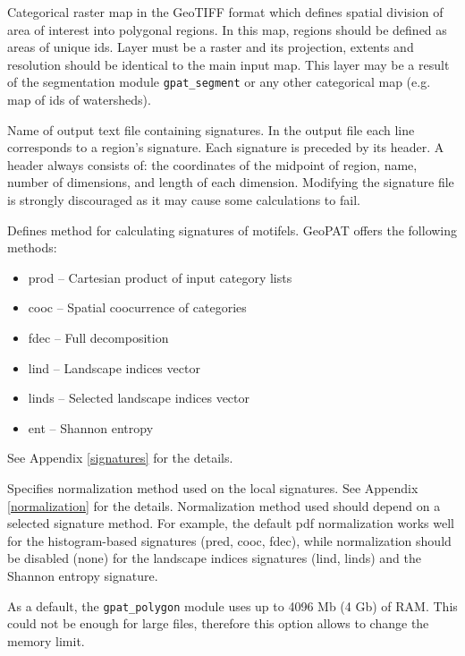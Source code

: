 
Categorical raster map in the GeoTIFF format which defines spatial division of area of interest into polygonal regions.
In this map, regions should be defined as areas of unique ids. 
Layer must be a raster and its projection, extents and resolution should be identical to the main input map. 
This layer may be a result of the segmentation module {\tt gpat\_segment} or any other categorical map (e.g. map of ids of watersheds).


Name of output text file containing signatures. 
In the output file each line corresponds to a region's signature.
Each signature is preceded by its header. 
A header always consists of: the coordinates of the midpoint of region, name, number of dimensions, and length of each dimension. 
Modifying the signature file is strongly discouraged as it may cause some calculations to fail.


Defines method for calculating signatures of motifels. 
GeoPAT offers the following methods: 
\begin{itemize}
	\item prod -- Cartesian product of input category lists
	\item cooc -- Spatial coocurrence of categories
	\item fdec -- Full decomposition
	\item lind -- Landscape indices vector
	\item linds -- Selected landscape indices vector
	\item ent -- Shannon entropy
\end{itemize}
See Appendix \ref{signatures} for the details.


Specifies normalization method used on the local signatures. 
See Appendix \ref{normalization} for the details.
Normalization method used should depend on a selected signature method. 
For example, the default pdf normalization works well for the histogram-based signatures (pred, cooc, fdec), while normalization should be disabled (none) for the landscape indices signatures (lind, linds) and the Shannon entropy signature.


As a default, the {\tt gpat\_polygon} module uses up to 4096 Mb (4 Gb) of RAM. 
This could not be enough for large files, therefore this option allows to change the memory limit. 

